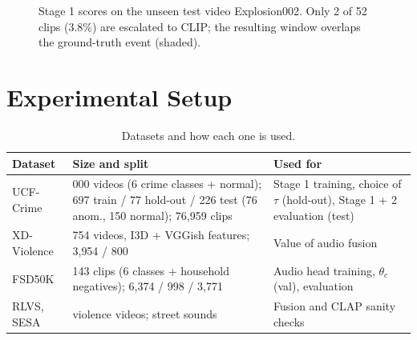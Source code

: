 \documentclass[conference,a4paper]{IEEEtran}
\begin{document}
\begin{figure}[t]
\centering
{}
\caption{Stage 1 scores on the unseen test video Explosion002. Only 2 of 52 clips (3.8\%) are escalated to CLIP;
the resulting window overlaps the ground-truth event (shaded).}
\label{fig:e002}
\end{figure}

\section{Experimental Setup}\label{sec:setup}
\begin{table}[t]
\centering
\caption{Datasets and how each one is used.}
\label{tab:data}
\footnotesize
\setlength{\tabcolsep}{3pt}
\begin{tabular}{@{}>{\raggedright\arraybackslash}p{1.6cm}>{\raggedright\arraybackslash}p{3.35cm}>{\raggedright\arraybackslash}p{2.85cm}@{}}
\toprule
Dataset & Size and split & Used for \\
\midrule
UCF-Crime \cite{sultani} & 1{,}000 videos (6 crime classes + normal); 697 train / 77 hold-out / 226 test (76 anom., 150 normal); 76{,}959 clips &
  Stage 1 training, choice of $\tau$ (hold-out), Stage 1 + 2 evaluation (test) \\[2pt]
XD-Violence \cite{xdv} & 4{,}754 videos, I3D + VGGish features; 3{,}954 / 800 & Value of audio fusion \\[2pt]
FSD50K \cite{fsd50k} & 11{,}143 clips (6 classes + household negatives); 6{,}374 / 998 / 3{,}771 & Audio head training, $\theta_c$ (val), evaluation \\[2pt]
RLVS, SESA & violence videos; street sounds & Fusion and CLAP sanity checks \\
\bottomrule
\end{tabular}
\end{table}
\end{document}
